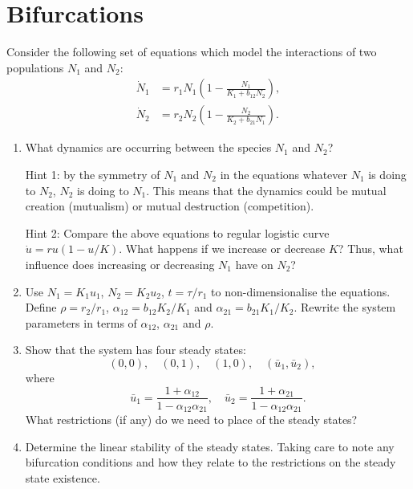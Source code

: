 \documentclass[]{article}
\newcommand{\bb}{\begin{equation}}
\newcommand{\ee}{\end{equation}}
\renewcommand{\l}{\left(}
\renewcommand{\r}{\right)}
\begin{document}
\section{Bifurcations}
Consider the following set of equations which model the interactions of two populations $N_1$ and $N_2$:
\begin{align}
\dot{N}_1&=r_1N_1\l 1-\frac{N_1}{K_1+b_{12}N_2}\r,\\
\dot{N}_2&=r_2N_2\l 1-\frac{N_2}{K_2+b_{21}N_1}\r.
\end{align}
\begin{enumerate}
\item What dynamics are occurring between the species $N_1$ and $N_2$?

Hint 1: by the symmetry of $N_1$ and $N_2$ in the equations whatever $N_1$ is doing to $N_2$, $N_2$ is doing to $N_1$. This means that the dynamics could be mutual creation (mutualism) or mutual destruction (competition).

Hint 2: Compare the above equations to regular logistic curve $\dot{u}=ru(1-u/K)$. What happens if we increase or decrease $K$? Thus, what influence does increasing or decreasing $N_1$ have on $N_2$?

\item Use $N_1=K_1u_1$, $N_2=K_2u_2$, $t=\tau/r_1$ to non-dimensionalise the equations. Define $\rho=r_2/r_1$, $\alpha_{12}=b_{12}K_2/K_1$ and $\alpha_{21}=b_{21}K_1/K_2$. Rewrite the system parameters in terms of $\alpha_{12}$, $\alpha_{21}$ and $\rho$.

\item Show that the system has four steady states:
\bb
(0,0), \quad (0,1), \quad (1,0), \quad (\bar{u}_1,\bar{u}_2), \quad
\ee
where
\bb
\bar{u}_1=\frac{1+\alpha_{12}}{1-\alpha_{12}\alpha_{21}},\quad\bar{u}_2=\frac{1+\alpha_{21}}{1-\alpha_{12}\alpha_{21}}.
\ee
What restrictions (if any) do we need to place of the steady states?
\item Determine the linear stability of the steady states. Taking care to note any bifurcation conditions and how they relate to the restrictions on the steady state existence.
\end{enumerate}
\end{document}
